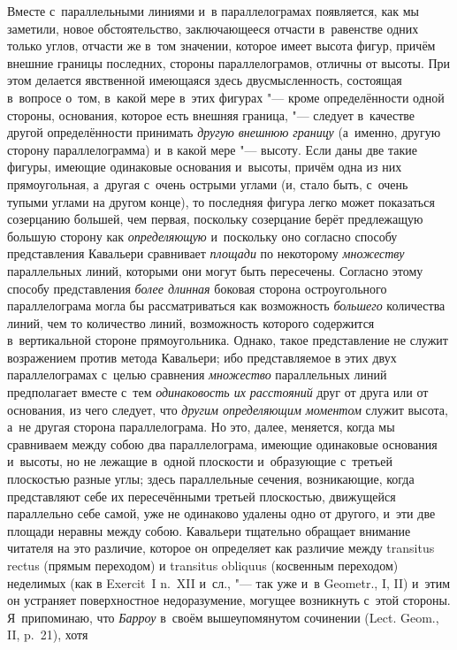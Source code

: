 Вместе с~параллельными линиями и~в параллелограмах появляется, как мы заметили,
новое обстоятельство, заключающееся отчасти в~равенстве одних только углов,
отчасти же в~том значении, которое имеет высота фигур, причём внешние границы
последних, стороны параллелограмов, отличны от высоты. При этом делается
явственной имеющаяся здесь двусмысленность, состоящая в~вопросе о~том, в~какой
мере в~этих фигурах "--- кроме определённости одной стороны, основания, которое
есть внешняя граница, "--- следует в~качестве другой определённости принимать
{\em другую внешнюю границу} (а~именно, другую сторону параллелограмма) и~в
какой мере "--- высоту. Если даны две такие фигуры, имеющие одинаковые
основания и~высоты, причём одна из них прямоугольная, а~другая с~очень острыми
углами (и, стало быть, с~очень тупыми углами на другом конце), то последняя
фигура легко может показаться созерцанию большей, чем первая, поскольку
созерцание берёт предлежащую большую сторону как {\em определяющую} и~поскольку
оно согласно способу представления Кавальери сравнивает {\em площади} по
некоторому {\em множеству} параллельных линий, которыми они могут быть
пересечены. Согласно этому способу представления {\em более длинная} боковая
сторона остроугольного параллелограма могла бы рассматриваться как возможность
{\em большего} количества линий, чем то количество линий, возможность
которого содержится в~вертикальной стороне прямоугольника. Однако, такое
представление не служит возражением против метода Кавальери; ибо представляемое
в этих двух параллелограмах с~целью сравнения {\em множество} параллельных
линий предполагает вместе с~тем {\em одинаковость их расстояний} друг от друга
или от основания, из чего следует, что {\em другим определяющим моментом}
служит высота, а~не другая сторона параллелограма. Но это, далее, меняется,
когда мы сравниваем между собою два параллелограма, имеющие одинаковые
основания и~высоты, но не лежащие в~одной плоскости и~образующие с~третьей
плоскостью разные углы; здесь параллельные сечения, возникающие, когда
представляют себе их пересечёнными третьей плоскостью, движущейся параллельно
себе самой, уже не одинаково удалены одно от другого, и~эти две площади неравны
между собою. Кавальери тщательно обращает внимание читателя на это различие,
которое он определяет как различие между transitus rectus (прямым переходом) и
transitus obliquus (косвенным переходом) неделимых (как в Exercit~I n.~XII
и~сл., "--- так уже и~в Geometr., I, II) и~этим он устраняет поверхностное
недоразумение, могущее возникнуть с~этой стороны. Я~припоминаю, что
{\em Барроу} в~своём вышеупомянутом сочинении (Lect. Geom., II, p.~21), хотя
